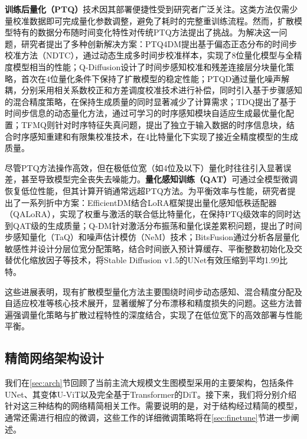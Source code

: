 \documentclass[11pt,a4paper,UTF8]{ctexart}
\begin{document}
\textbf{训练后量化（PTQ）}技术因其部署便捷性受到研究者广泛关注。这类方法仅需少量校准数据即可完成量化参数调整，避免了耗时的完整重训练流程。然而，扩散模型特有的数据分布随时间变化特性对传统PTQ方法提出了挑战。为解决这一问题，研究者提出了多种创新解决方案：PTQ4DM\cite{shang2023post}提出基于偏态正态分布的时间步校准方法（NDTC），通过动态生成多时间步校准样本，实现了8位量化模型与全精度模型相当的性能；Q-Diffusion\cite{li2023q}设计了时间步感知校准和残差连接层分块量化策略，首次在4位量化条件下保持了扩散模型的稳定性能；PTQD\cite{he2023ptqd}通过量化噪声解耦，分别采用相关系数校正和方差调度校准技术进行补偿，同时引入基于步骤感知的混合精度策略，在保持生成质量的同时显著减少了计算需求；TDQ\cite{so2023temporal}提出了基于时间步信息的动态量化方法，通过可学习的时序感知模块自适应生成最优量化配置；TFMQ\cite{Huang_2024_CVPR}则针对时序特征失真问题，提出了独立于输入数据的时序信息块，结合时序感知重建和有限集校准技术，在4比特量化下实现了接近全精度模型的生成质量。

尽管PTQ方法操作高效，但在极低位宽（如4位及以下）量化时往往引入显著误差，甚至导致模型完全丧失去噪能力\cite{he2023ptqd}。\textbf{量化感知训练（QAT）}\cite{krishnamoorthi2018quantizing,esser2019learned}可通过全模型微调恢复低位性能，但其计算开销通常远超PTQ方法。为平衡效率与性能，研究者提出了一系列折中方案：EfficientDM\cite{he2024efficientdm}结合LoRA框架\cite{hu2022lora}提出量化感知低秩适配器（QALoRA），实现了权重与激活的联合低比特量化，在保持PTQ级效率的同时达到QAT级的生成质量；Q-DM\cite{li2023qdm}针对激活分布振荡和量化误差累积问题，提出了时间步感知量化（TaQ）和噪声估计模仿（NeM）技术；BitsFusion\cite{sui2024bitsfusion}通过分析各层量化敏感性并设计分层位宽分配策略，结合时间嵌入预计算缓存、平衡整数初始化及交替优化缩放因子等技术，将Stable Diffusion v1.5的UNet有效压缩到平均1.99比特。

这些进展表明，现有扩散模型量化方法主要围绕时间步动态感知、混合精度分配及自适应校准等核心技术展开，显著缓解了分布漂移和精度损失的问题。这些方法普遍强调量化策略与扩散过程特性的深度结合，实现了在低位宽下的高效部署与性能平衡。


\subsection{精简网络架构设计}

我们在\ref{sec:arch}节回顾了当前主流大规模文生图模型采用的主要架构，包括条件UNet\cite{rombach2022high}、其变体U-ViT\cite{uvit}以及完全基于Transformer的DiT\cite{peebles2022scalable}。接下来，我们将分别介绍针对这三种结构的网络精简相关工作。需要说明的是，对于结构经过精简的模型，通常还需进行相应的微调，这些工作的详细微调策略将在\ref{sec:finetune}节进一步阐述。
\end{document}
